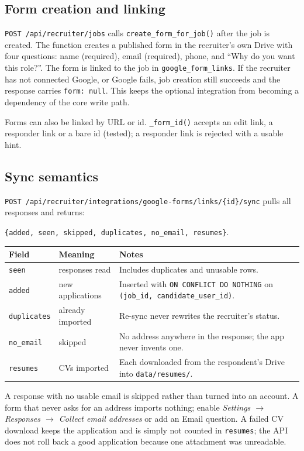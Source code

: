 \documentclass[11pt,a4paper]{article}
\newcommand{\file}[1]{\texttt{\small #1}}
\newcommand{\code}[1]{\texttt{#1}}
\newcommand{\api}[2]{\texttt{\small #1\,#2}}
\begin{document}
\subsection{Form creation and linking}
\api{POST}{/api/recruiter/jobs} calls \code{create\_form\_for\_job()} after the
job is created. The function creates a published form in the recruiter's own
Drive with four questions: name (required), email (required), phone, and
``Why do you want this role?''. The form is linked to the job in
\code{google\_form\_links}. If the recruiter has not connected Google, or
Google fails, job creation still succeeds and the response carries
\code{form: null}. This keeps the optional integration from becoming a
dependency of the core write path.

Forms can also be linked by URL or id. \code{\_form\_id()} accepts an edit
link, a responder link or a bare id (tested); a responder link is rejected with
a usable hint.

\subsection{Sync semantics}
\api{POST}{/api/recruiter/integrations/google-forms/links/\{id\}/sync} pulls
all responses and returns:
\begin{center}
\code{\{added, seen, skipped, duplicates, no\_email, resumes\}}.
\end{center}
\begin{center}
\begin{tabular}{@{}llp{9.3cm}@{}}
\toprule
\textbf{Field} & \textbf{Meaning} & \textbf{Notes}\\
\midrule
\code{seen} & responses read & Includes duplicates and unusable rows.\\
\code{added} & new applications & Inserted with \code{ON CONFLICT DO NOTHING}
  on \code{(job\_id, candidate\_user\_id)}.\\
\code{duplicates} & already imported & Re-sync never rewrites the recruiter's
  status.\\
\code{no\_email} & skipped & No address anywhere in the response; the app never
  invents one.\\
\code{resumes} & CVs imported & Each downloaded from the respondent's Drive
  into \file{data/resumes/}.\\
\bottomrule
\end{tabular}
\end{center}

A response with no usable email is skipped rather than turned into an account.
A form that never asks for an address imports nothing; enable
\emph{Settings $\rightarrow$ Responses $\rightarrow$ Collect email addresses}
or add an Email question. A failed CV download keeps the application and is
simply not counted in \code{resumes}; the API does not roll back a good
application because one attachment was unreadable.
\end{document}
